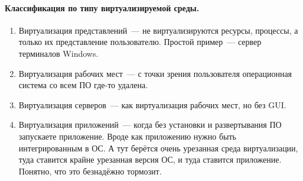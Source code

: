 \documentclass{article}
\begin{document}
    \paragraph{Классификация по типу виртуализируемой среды.}
    \begin{enumerate}
        \item Виртуализация представлений~--- не виртуализируются ресурсы, процессы, а только их представление пользователю. Простой пример~--- сервер терминалов Windows. 
        \item Виртуализация рабочих мест~--- с точки зрения пользователя операционная система со всем ПО где-то удалена.
        \item Виртуализация серверов~--- как виртуализация рабочих мест, но без GUI.
        \item Виртуализация приложений~--- когда без установки и развертывания ПО запускаете приложение. Вроде как приложению нужно быть интегрированным в ОС. А тут берётся очень урезанная среда виртуализации, туда ставится крайне урезанная версия ОС, и туда ставится приложение. Понятно, что это безнадёжно тормозит.
    \end{enumerate}
\end{document}
